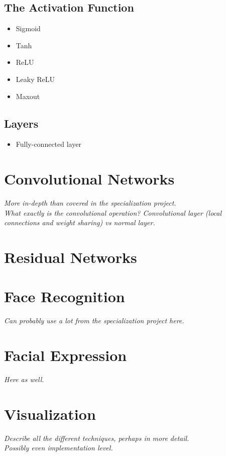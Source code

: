 \subsection{The Activation Function}

\begin{itemize}
    \item Sigmoid
    \item Tanh
    \item ReLU
    \item Leaky ReLU
    \item Maxout
\end{itemize}

\subsection{Layers}

\begin{itemize}
    \item Fully-connected layer
\end{itemize}

\section{Convolutional Networks}

\textit{More in-depth than covered in the specialization project. \\
What exactly is the convolutional operation? Convolutional layer (local connections and weight sharing) vs normal layer.}

\section{Residual Networks}

\section{Face Recognition}

\textit{Can probably use a lot from the specialization project here.}

\section{Facial Expression}

\textit{Here as well.}

\section{Visualization}

\textit{Describe all the different techniques, perhaps in more detail. \\
Possibly even implementation level.}

\cleardoublepage